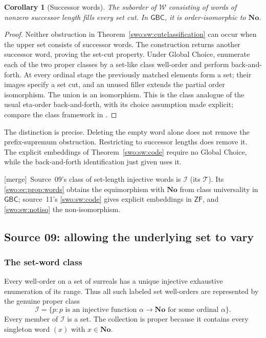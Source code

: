 \documentclass[11pt]{article}
\newtheorem{corollary}[corollary]{Corollary}
\theoremstyle{definition}
\theoremstyle{remark}
\newcommand{\No}{\mathbf{No}}
\newcommand{\Words}{\mathcal I}
\newcommand{\GBC}{\mathsf{GBC}}
\newcommand{\ZF}{\mathsf{ZF}}
\newcommand{\merge}{\textsf{[merge]}}
\begin{document}
\begin{corollary}[Successor words]\label{swo:sw:successors}
The suborder of \(\mathcal W\) consisting of words of nonzero
successor length fills every set cut.
In \(\GBC\), it is order-isomorphic to \(\No\).
\end{corollary}

\begin{proof}
Neither obstruction in Theorem~\ref{swo:sw:cutclassification}
can occur when the upper set consists of successor words.
The construction returns another successor word, proving
the set-cut property.
Under Global Choice, enumerate each of the two proper classes
by a set-like class well-order and perform back-and-forth.
At every ordinal stage the previously matched elements form
a set; their images specify a set cut, and an unused filler
extends the partial order isomorphism.
The union is an isomorphism.  This is the class analogue of
the usual eta-order back-and-forth, with its choice assumption
made explicit; compare the class framework in
\cite{Ehrlich2012}.
\end{proof}

The distinction is precise.  Deleting the empty word alone
does not remove the prefix-supremum obstruction.  Restricting
to successor lengths does remove it.  The explicit embeddings
of Theorem~\ref{swo:sw:code} require no Global Choice, while the
back-and-forth identification just given uses it.


\merge\ Source~09's class of set-length injective words is $\Words$ (its
$\mathcal T$). Its \cref{swo:ec:prop:words} obtains the equimorphism with
$\No$ from class universality in $\GBC$; source~11's \cref{swo:sw:code} gives
explicit embeddings in $\ZF$, and \cref{swo:sw:notiso} the non-isomorphism.

\subsection{Source 09: allowing the underlying set to vary}
\label{swo:ec:sec:words}
\subsubsection{The set-word class}
Every well-order on a set of surreals has a unique injective exhaustive
enumeration of its range. Thus all such labeled set well-orders are
represented by the genuine proper class
\[
 \Words=\{p:p\text{ is an injective function }
                  \alpha\to\No\text{ for some ordinal }\alpha\}.
\]
Every member of $\Words$ is a set. The collection is proper because it
contains every singleton word $(x)$ with $x\in\No$.
\end{document}
